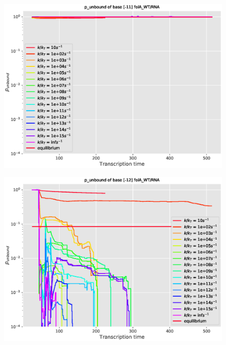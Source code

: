 \documentclass[11pt, a4paper]{article}
\begin{document}
\begin{figure}
\centering
\includegraphics[width=\linewidth]{p_unbound/RNA_p_unbound_base[-11]_k_tuning}
\caption{}
\label{fig:RNA_p_unbound_base[-11]_k_tuning}
\end{figure}
\begin{figure}
\centering
\includegraphics[width=\linewidth]{p_unbound/RNA_p_unbound_base[-12]_k_tuning}
\caption{}
\label{fig:RNA_p_unbound_base[-12]_k_tuning}
\end{figure}
\end{document}
